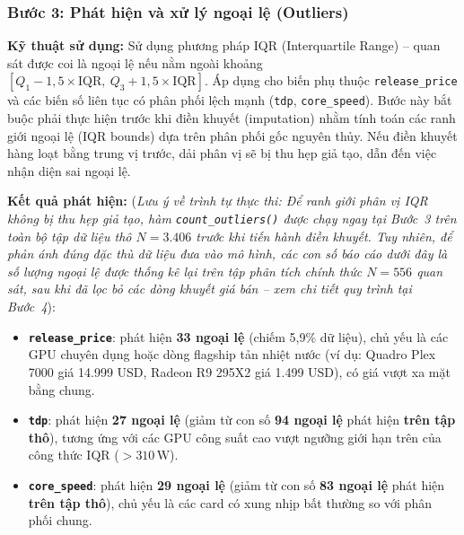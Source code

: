 \documentclass[12pt,a4paper]{article}
\begin{document}
\subsubsection*{Bước 3: Phát hiện và xử lý ngoại lệ (Outliers)}

\textbf{Kỹ thuật sử dụng:} Sử dụng phương pháp IQR (Interquartile Range) -- quan sát
được coi là ngoại lệ nếu nằm ngoài khoảng $[Q_1 - 1{,}5 \times \mathrm{IQR},\ Q_3 +
1{,}5 \times \mathrm{IQR}]$. Áp dụng cho biến phụ thuộc \texttt{release\_price} và các
biến số liên tục có phân phối lệch mạnh (\texttt{tdp}, \texttt{core\_speed}). Bước này
bắt buộc phải thực hiện trước khi điền khuyết (imputation) nhằm tính toán các ranh giới
ngoại lệ (IQR bounds) dựa trên phân phối gốc nguyên thủy. Nếu điền khuyết hàng loạt
bằng trung vị trước, dải phân vị sẽ bị thu hẹp giả tạo, dẫn đến việc nhận diện sai
ngoại lệ.

\textbf{Kết quả phát hiện:}
(\textit{Lưu ý về trình tự thực thi: Để ranh giới phân vị IQR không bị thu hẹp giả tạo,
hàm \texttt{count\_outliers()} được chạy ngay tại Bước~3 trên toàn bộ tập dữ liệu thô
$N = 3.406$ trước khi tiến hành điền khuyết. Tuy nhiên, để phản ánh đúng đặc thù dữ
liệu đưa vào mô hình, các con số báo cáo dưới đây là số lượng ngoại lệ được thống kê lại
trên tập phân tích chính thức $N = 556$ quan sát, sau khi đã lọc bỏ các dòng khuyết giá
bán -- xem chi tiết quy trình tại Bước~4}):

\begin{itemize}[leftmargin=1.5em]
  \item \textbf{\texttt{release\_price}}: phát hiện \textbf{33 ngoại lệ} (chiếm 5,9\%
        dữ liệu), chủ yếu là các GPU chuyên dụng hoặc dòng flagship tản nhiệt nước (ví
        dụ: Quadro Plex 7000 giá 14.999 USD, Radeon R9 295X2 giá 1.499 USD), có giá vượt
        xa mặt bằng chung.

  \item \textbf{\texttt{tdp}}: phát hiện \textbf{27 ngoại lệ} (giảm từ con số \textbf{94
        ngoại lệ} phát hiện \textbf{trên tập thô}), tương ứng với các GPU công suất cao
        vượt ngưỡng giới hạn trên của công thức IQR ($> 310\,\mathrm{W}$).

  \item \textbf{\texttt{core\_speed}}: phát hiện \textbf{29 ngoại lệ} (giảm từ con số
        \textbf{83 ngoại lệ} phát hiện \textbf{trên tập thô}), chủ yếu là các card có
        xung nhịp bất thường so với phân phối chung.
\end{itemize}
\end{document}

